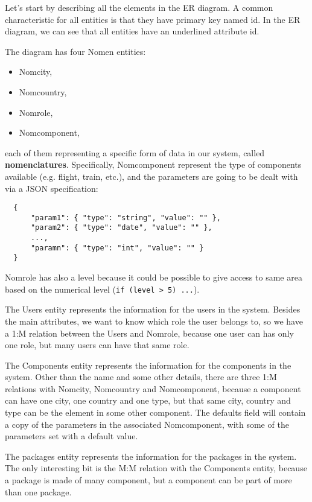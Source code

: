 \documentclass[a4paper,12pt]{book}
\begin{document}
Let's start by describing all the elements in the ER diagram. A common characteristic for all entities is that they have primary key named id. In the ER diagram, we can see that all entities have an underlined attribute id.

The diagram has four Nomen entities:
\begin{itemize}[noitemsep]
  \item Nomcity,
  \item Nomcountry,
  \item Nomrole,
  \item Nomcomponent,
\end{itemize}
each of them representing a specific form of data in our system, called \textbf{nomenclatures}. Specifically, Nomcomponent represent the type of components available (e.g. flight, train, etc.), and the parameters are going to be dealt with via a JSON specification:
\begin{verbatim}
  {
      "param1": { "type": "string", "value": "" },
      "param2": { "type": "date", "value": "" },
      ...,
      "paramn": { "type": "int", "value": "" }
  }
\end{verbatim}
Nomrole has also a level because it could be possible to give access to same area based on the numerical level (\texttt{if (level > 5) ...}).\newline

The Users entity represents the information for the users in the system. Besides the main attributes, we want to know which role the user belongs to, so we have a 1:M relation between the Users and Nomrole, because one user can has only one role, but many users can have that same role.\newline

The Components entity represents the information for the components in the system. Other than the name and some other details, there are three 1:M relations with Nomcity, Nomcountry and Nomcomponent, because a component can have one city, one country and one type, but that same city, country  and type can be the element in some other component. The defaults field will contain a copy of the parameters in the associated Nomcomponent, with some of the parameters set with a default value.\newline

The packages entity represents the information for the packages in the system. The only interesting bit is the M:M relation with the Components entity, because a package is made of many component, but a component can be part of more than one package.\newline
\end{document}
